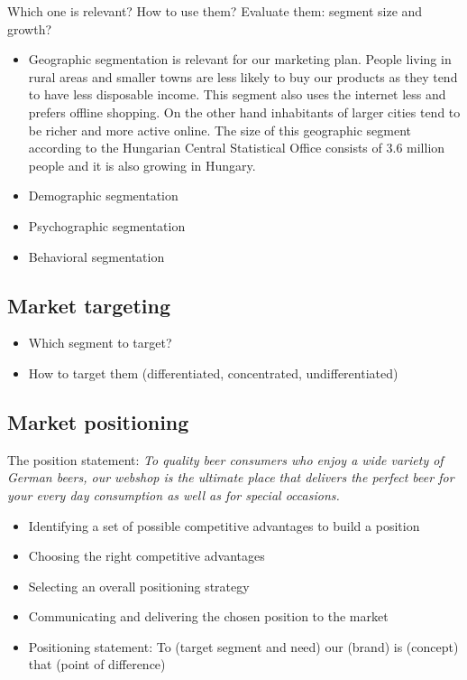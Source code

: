 Which one is relevant? How to use them? Evaluate them: segment size and growth?
\begin{itemize}
   \item Geographic segmentation is relevant for our marketing plan. People living in rural areas and smaller towns are  less likely to buy our products as they tend to have less disposable income. This segment also uses the internet less and prefers offline shopping. On the other hand inhabitants of larger cities tend to be richer and more active online. The size of this geographic segment according to the Hungarian Central Statistical Office consists of 3.6 million people \cite{ksh1} and it is also growing in Hungary.
   \item Demographic segmentation
   \item Psychographic segmentation
   \item Behavioral segmentation
\end{itemize}

\subsection{Market targeting}

\begin{itemize}
   \item Which segment to target?
   \item How to target them (differentiated, concentrated, undifferentiated)
\end{itemize}

\subsection{Market positioning}
The position statement:
\textit{To quality beer consumers who enjoy a wide variety of German beers, our webshop is the ultimate place that delivers the perfect beer for your every day consumption as well as for special occasions.}


\begin{itemize}
   \item Identifying a set of possible competitive advantages to build a position
   \item Choosing the right competitive advantages
   \item Selecting an overall positioning strategy
   \item Communicating and delivering the chosen position to the market
   \item Positioning statement:  To (target segment and need) our (brand) is (concept) that (point of difference)
\end{itemize}

